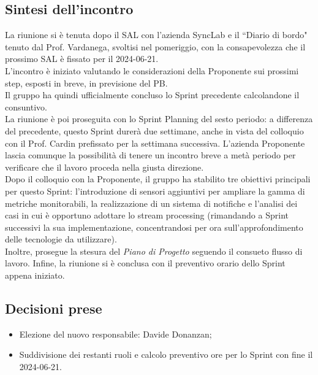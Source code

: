 \documentclass[8pt]{article}
\begin{document}
\subsection{Sintesi dell'incontro}
La riunione si è tenuta dopo il SAL con l'azienda SyncLab e il ``Diario di bordo" tenuto dal Prof. Vardanega, svoltisi nel pomeriggio, con la
consapevolezza che il prossimo SAL è fissato per il 2024-06-21. \\ L'incontro è iniziato
valutando le considerazioni della Proponente sui prossimi step, esposti in breve, in previsione del PB. \\Il gruppo ha quindi ufficialmente concluso lo Sprint
precedente calcolandone il consuntivo. \\
La riunione è poi proseguita con lo Sprint Planning del sesto periodo: a differenza del precedente, questo Sprint durerà due
settimane, anche in vista del colloquio con il Prof. Cardin prefissato per la settimana successiva. L'azienda Proponente lascia comunque la possibilità di tenere un incontro breve a metà periodo per verificare che il lavoro proceda nella giusta direzione. \\
Dopo il colloquio con la Proponente, il gruppo ha stabilito tre obiettivi principali per questo Sprint: l'introduzione di sensori aggiuntivi per ampliare la gamma di metriche monitorabili, la realizzazione di un sistema di notifiche e
l'analisi dei casi in cui è opportuno adottare lo stream processing (rimandando a Sprint successivi la sua
implementazione, concentrandosi per ora sull'approfondimento delle tecnologie da utilizzare).
\\Inoltre, prosegue la stesura del \textit{Piano di Progetto} seguendo il consueto flusso di lavoro. Infine, la
riunione si è conclusa con il preventivo orario dello Sprint appena iniziato.
\subsection{Decisioni prese}
\begin{itemize}
	\setlength\itemsep{0em}
    \item Elezione del nuovo responsabile: Davide Donanzan;
    \item Suddivisione dei restanti ruoli e calcolo preventivo ore per lo Sprint con fine il
        2024-06-21.
\end{itemize}
\newpage
\end{document}
